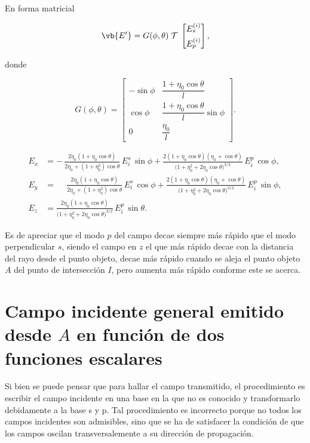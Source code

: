 En forma matricial

\[
\vb{E'} = 
G(\phi,\theta)\;\mathcal T\;
\begin{bmatrix}E^{(i)}_s\\[4pt]E^{(i)}_p\end{bmatrix},
\]

donde 

\[
G(\phi,\theta)=
\begin{bmatrix}
-\sin\phi & \dfrac{1+\eta_0\cos\theta}{\,l\,}\\[8pt]
\cos\phi  & \dfrac{1+\eta_0\cos\theta}{\,l\,}\sin\phi\\[8pt]
0         & \dfrac{\eta_0}{\,l\,}
\end{bmatrix}.
\]


    







\begin{align}
E_x &= -\,\frac{2\eta_0(1+\eta_0\cos\theta)}{2\eta_0+(1+\eta_0^2)\cos\theta}\,E_i^{s}\,\sin\phi
     + \frac{2(1+\eta_0\cos\theta)(\eta_0+\cos\theta)}{\bigl(1+\eta_0^2+2\eta_0\cos\theta\bigr)^{3/2}}\,E_i^{p}\,\cos\phi, \\[6pt]
E_y &= \phantom{-}\frac{2\eta_0(1+\eta_0\cos\theta)}{2\eta_0+(1+\eta_0^2)\cos\theta}\,E_i^{s}\,\cos\phi
     + \frac{2(1+\eta_0\cos\theta)(\eta_0+\cos\theta)}{\bigl(1+\eta_0^2+2\eta_0\cos\theta\bigr)^{3/2}}\,E_i^{p}\,\sin\phi, \\[6pt]
E_z &= \frac{2\eta_0(1+\eta_0\cos\theta)}{\bigl(1+\eta_0^2+2\eta_0\cos\theta\bigr)^{3/2}}\,E_i^{p}\,\sin\theta.
\end{align}


Es de apreciar que el modo $p$ del campo decae siempre
más rápido que el modo perpendicular $s$, siendo el
campo en $z$ el que más rápido decae con la distancia
del rayo desde el punto objeto, decae más rápido cuando se aleja el punto objeto $A$ del punto de intersección $I$, pero aumenta más rápido conforme este se acerca. 




\section[Campo incidente general emitido desde A en función de dos funciones escalares]{Campo incidente general emitido desde $A$ en función de dos funciones escalares}


Si bien se puede pensar que para hallar el campo transmitido, 
el procedimiento es escribir el campo incidente en una base en la que no 
es conocido y transformarlo debidamente a la base s y p. Tal procedimiento es incorrecto porque no todos los campos incidentes son admisibles, sino que se 
ha de satisfacer la condición de que los campos oscilan transversalemente a su dirección de propagación. 

